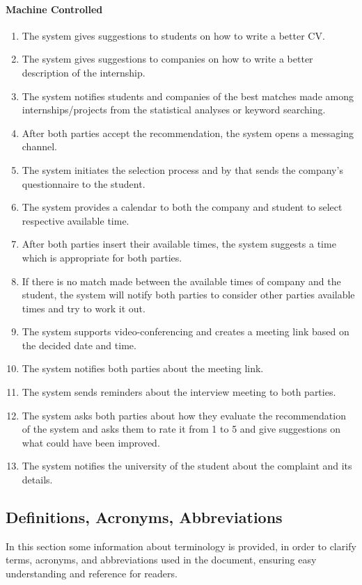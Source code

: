 \paragraph{Machine Controlled}
\begin{enumerate}[label=SP{\arabic*}]
\item
The system gives suggestions to students on how to write a better CV.
\item
The system gives suggestions to companies on how to write a better description of the internship.
\item
The system notifies students and companies of the best matches made among internships/projects from the statistical analyses or keyword searching.
\item
After both parties accept the recommendation, the system opens a messaging channel.
\item
The system initiates the selection process and by that sends the company’s questionnaire to the student.
\item
The system provides a calendar to both the company and student to select respective available time.
\item
After both parties insert their available times, the system suggests a time which is appropriate for both parties. 
\item
If there is no match made between the available times of company and the student, the system will notify both parties to consider other parties available times and try to work it out. 
\item
The system supports video-conferencing and creates a meeting link based on the decided date and time.
\item
The system notifies both parties about the meeting link.
\item
The system sends reminders about the interview meeting to both parties.
\item
The system asks both parties about how they evaluate the recommendation of the system and asks them to rate it from 1 to 5 and give suggestions on what could have been improved.
\item 
The system notifies the university of the student about the complaint and its details.

\end{enumerate}

\subsection{Definitions, Acronyms, Abbreviations}
In this section some information about terminology is provided, in order to clarify terms,
acronyms, and abbreviations used in the document, ensuring easy understanding and reference
for readers.

